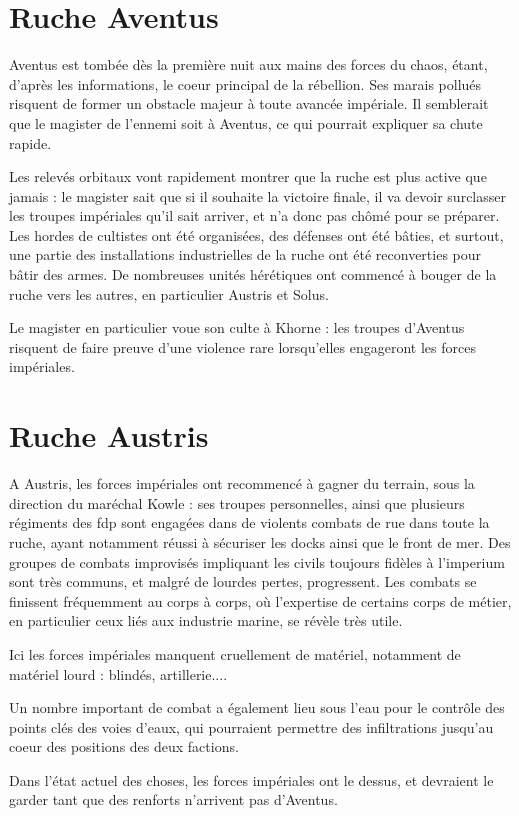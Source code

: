 \documentclass[10pt,a4paper]{book}
\begin{document}
\section{Ruche Aventus}
Aventus est tombée dès la première nuit aux mains des forces du chaos, étant, d'après les informations, le coeur principal de la rébellion. Ses marais pollués risquent de former un obstacle majeur à toute avancée impériale. Il semblerait que le magister de l'ennemi soit à Aventus, ce qui pourrait expliquer sa chute rapide.

Les relevés orbitaux vont rapidement montrer que la ruche est plus active que jamais : le magister sait que si il souhaite la victoire finale, il va devoir surclasser les troupes impériales qu'il sait arriver, et n'a donc pas chômé pour se préparer. Les hordes de cultistes ont été organisées, des défenses ont été bâties, et surtout, une partie des installations industrielles de la ruche ont été reconverties pour bâtir des armes. De nombreuses unités hérétiques ont commencé à bouger de la ruche vers les autres, en particulier Austris et Solus.

Le magister en particulier voue son culte à Khorne : les troupes d'Aventus risquent de faire preuve d'une violence rare lorsqu'elles engageront les forces impériales.
\section{Ruche Austris}
A Austris, les forces impériales ont recommencé à gagner du terrain, sous la direction du maréchal Kowle : ses troupes personnelles, ainsi que plusieurs régiments des fdp sont engagées dans de violents combats de rue dans toute la ruche, ayant notamment réussi à sécuriser les docks ainsi que le front de mer. Des groupes de combats improvisés impliquant les civils toujours fidèles à l'imperium sont très communs, et malgré de lourdes pertes, progressent. Les combats se finissent fréquemment au corps à corps, où l'expertise de certains corps de métier, en particulier ceux liés aux industrie marine, se révèle très utile. 

Ici les forces impériales manquent cruellement de matériel, notamment de matériel lourd : blindés, artillerie.... 

Un nombre important de combat a également lieu sous l'eau pour le contrôle des points clés des voies d'eaux, qui pourraient permettre des infiltrations jusqu'au coeur des positions des deux factions.

Dans l'état actuel des choses, les forces impériales ont le dessus, et devraient le garder tant que des renforts n'arrivent pas d'Aventus.
\end{document}
